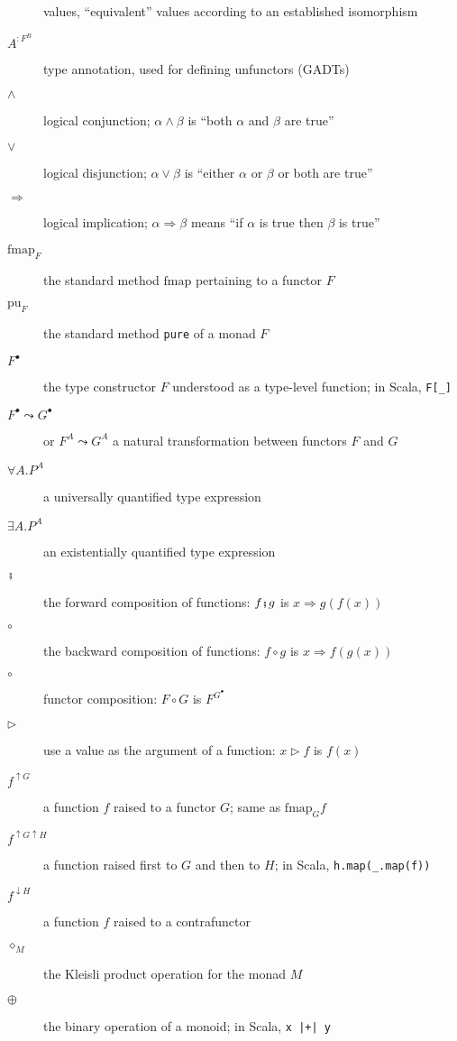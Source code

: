 \begin{description}
values, ``equivalent'' values according to an established isomorphism
\item [{$A^{:F^{B}}$}] type annotation, used for defining unfunctors (GADTs)
\item [{$\wedge$}] logical conjunction; $\alpha\wedge\beta$ is ``both
$\alpha$ and $\beta$ are true''
\item [{$\vee$}] logical disjunction; $\alpha\vee\beta$ is ``either
$\alpha$ or $\beta$ or both are true''
\item [{$\Rightarrow$}] logical implication; $\alpha\Rightarrow\beta$
means ``if $\alpha$ is true then $\beta$ is true''
\item [{$\text{fmap}_{F}$}] the standard method $\text{fmap}$ pertaining
to a functor $F$ 
\item [{$\text{pu}_{F}$}] the standard method \lstinline!pure!
of a monad $F$ 
\item [{$F^{\bullet}$}] the type constructor $F$ understood as a type-level
function; in Scala, \lstinline!F[_]! 
\item [{$F^{\bullet}\leadsto G^{\bullet}$}] or $F^{A}\leadsto G^{A}$
a natural transformation between functors $F$ and $G$ 
\item [{$\forall A.P^{A}$}] a universally quantified type expression 
\item [{$\exists A.P^{A}$}] an existentially quantified type expression 
\item [{$\bef$}] the forward composition of functions: $f\bef g$ is $x\Rightarrow g(f(x))$
\item [{$\circ$}] the backward composition of functions: $f\circ g$ is
$x\Rightarrow f(g(x))$
\item [{$\circ$}] functor composition: $F\circ G$ is $F^{G^{\bullet}}$ 
\item [{$\triangleright$}] use a value as the argument of a function:
$x\triangleright f$ is $f(x)$
\item [{$f^{\uparrow G}$}] a function $f$ raised to a functor $G$; same
as $\text{fmap}_{G}f$
\item [{$f^{\uparrow G\uparrow H}$}] a function raised first to $G$ and
then to $H$; in Scala, \lstinline!h.map(_.map(f))! 
\item [{$f^{\downarrow H}$}] a function $f$ raised to a contrafunctor 
\item [{$\diamond_{M}$}] the Kleisli product operation for the monad $M$
\item [{$\oplus$}] the binary operation of a monoid; in Scala, \lstinline!x |+| y!

\end{description}
